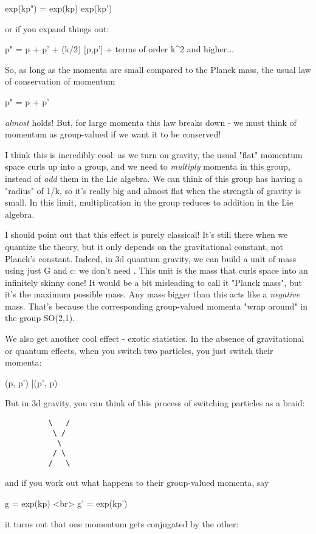 exp(kp") = exp(kp) exp(kp') 

or if you expand things out:

p" = p + p' + (k/2) [p,p'] + terms of order k^{2} and higher... 

So, as long as the momenta are small compared to the Planck mass, 
the usual law of conservation of momentum

p" = p + p'

\emph{almost} holds!   But, for large momenta this law breaks down - we 
must think of momentum as group-valued if we want it to be conserved!

I think this is incredibly cool: as we turn on gravity, the usual
"flat" momentum space curls up into a group, and we need to
\emph{multiply} momenta in this group, instead of \emph{add} them
in the Lie algebra.  We can think of this group has having a
"radius" of 1/k, so it's really big and almost flat when the
strength of gravity is small.  In this limit, multiplication in the
group reduces to addition in the Lie algebra.

I should point out that this effect is purely classical!  It's still
there when we quantize the theory, but it only depends on the
gravitational constant, not Planck's constant.  Indeed, in 3d quantum
gravity, we can build a unit of mass using just G and c: we don't need
\hbar .  This unit is the mass that curls space into an infinitely
skinny cone!  It would be a bit misleading to call it "Planck
mass", but it's the maximum possible mass.  Any mass bigger than
this acts like a \emph{negative} mass.  That's because the corresponding
group-valued momenta "wrap around" in the group SO(2,1).

We also get another cool effect - exotic statistics.  In the absence 
of gravitational or quantum effects, when you switch two particles, 
you just switch their momenta:

(p, p') |\to  (p', p) 

But in 3d gravity, you can think of this process of switching 
particles as a braid: 

\begin{verbatim}
          \   /
           \ / 
            \
           / \
          /   \
\end{verbatim}
    

and if you work out what happens to their group-valued momenta,
say  

g  = exp(kp) <br>
g' = exp(kp')

it turns out that one momentum gets conjugated by the other:

